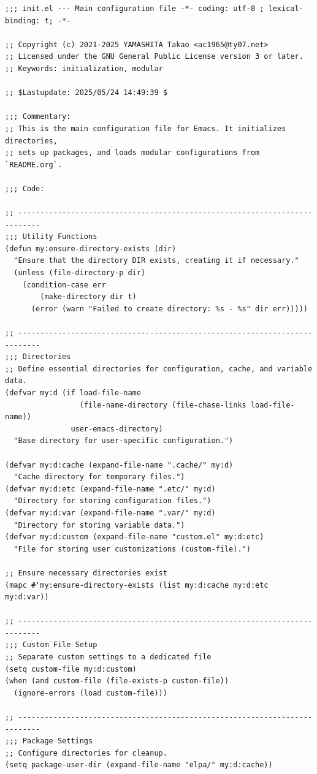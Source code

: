 \documentclass[11pt]{article}
\begin{document}
\begin{verbatim}
;;; init.el --- Main configuration file -*- coding: utf-8 ; lexical-binding: t; -*-

;; Copyright (c) 2021-2025 YAMASHITA Takao <ac1965@ty07.net>
;; Licensed under the GNU General Public License version 3 or later.
;; Keywords: initialization, modular

;; $Lastupdate: 2025/05/24 14:49:39 $

;;; Commentary:
;; This is the main configuration file for Emacs. It initializes directories,
;; sets up packages, and loads modular configurations from `README.org`.

;;; Code:

;; ---------------------------------------------------------------------------
;;; Utility Functions
(defun my:ensure-directory-exists (dir)
  "Ensure that the directory DIR exists, creating it if necessary."
  (unless (file-directory-p dir)
    (condition-case err
        (make-directory dir t)
      (error (warn "Failed to create directory: %s - %s" dir err)))))

;; ---------------------------------------------------------------------------
;;; Directories
;; Define essential directories for configuration, cache, and variable data.
(defvar my:d (if load-file-name
                 (file-name-directory (file-chase-links load-file-name))
               user-emacs-directory)
  "Base directory for user-specific configuration.")

(defvar my:d:cache (expand-file-name ".cache/" my:d)
  "Cache directory for temporary files.")
(defvar my:d:etc (expand-file-name ".etc/" my:d)
  "Directory for storing configuration files.")
(defvar my:d:var (expand-file-name ".var/" my:d)
  "Directory for storing variable data.")
(defvar my:d:custom (expand-file-name "custom.el" my:d:etc)
  "File for storing user customizations (custom-file).")

;; Ensure necessary directories exist
(mapc #'my:ensure-directory-exists (list my:d:cache my:d:etc my:d:var))

;; ---------------------------------------------------------------------------
;;; Custom File Setup
;; Separate custom settings to a dedicated file
(setq custom-file my:d:custom)
(when (and custom-file (file-exists-p custom-file))
  (ignore-errors (load custom-file)))

;; ---------------------------------------------------------------------------
;;; Package Settings
;; Configure directories for cleanup.
(setq package-user-dir (expand-file-name "elpa/" my:d:cache))


\end{verbatim}
\end{document}

